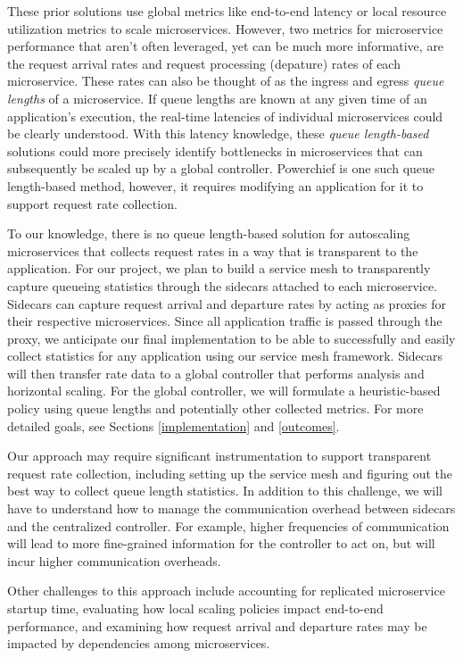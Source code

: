 \documentclass{proposal}
\begin{document}
These prior solutions use global metrics like end-to-end latency or local resource utilization metrics to scale microservices. However, two metrics for microservice performance that aren't often leveraged, yet can be much more informative, are the request arrival rates and request processing (depature) rates of each microservice. These rates can also be thought of as the ingress and egress \textit{queue lengths} of a microservice. If queue lengths are known at any given time of an application's execution, the real-time latencies of individual microservices could be clearly understood. With this latency knowledge, these \textit{queue length-based} solutions could more precisely identify bottlenecks in microservices that can subsequently be scaled up by a global controller. Powerchief \cite{powerchief} is one such queue length-based method, however, it requires modifying an application for it to support request rate collection.

To our knowledge, there is no queue length-based solution for autoscaling microservices that collects request rates in a way that is transparent to the application. For our project, we plan to build a service mesh to transparently capture queueing statistics through the sidecars attached to each microservice. Sidecars can capture request arrival and departure rates by acting as proxies for their respective microservices. Since all application traffic is passed through the proxy, we anticipate our final implementation to be able to successfully and easily collect statistics for any application using our service mesh framework. Sidecars will then transfer rate data to a global controller that performs analysis and horizontal scaling. For the global controller, we will formulate a heuristic-based policy using queue lengths and potentially other collected metrics. For more detailed goals, see Sections \ref{implementation} and \ref{outcomes}.

Our approach may require significant instrumentation to support transparent request rate collection, including setting up the service mesh and figuring out the best way to collect queue length statistics. In addition to this challenge, we will have to understand how to manage the communication overhead between sidecars and the centralized controller. For example, higher frequencies of communication will lead to more fine-grained information for the controller to act on, but will incur higher communication overheads.

Other challenges to this approach include accounting for replicated microservice startup time, evaluating how local scaling policies impact end-to-end performance, and examining how request arrival and departure rates may be impacted by dependencies among microservices.
\end{document}
